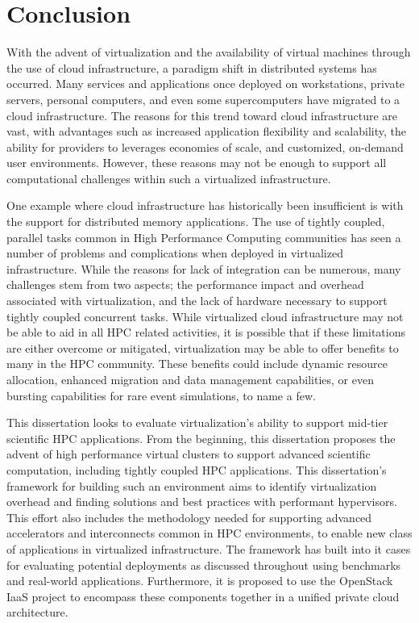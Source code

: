 
\chapter{Conclusion}
\label{chap:conc}

With the advent of virtualization and the availability of virtual machines through the use of cloud infrastructure, a paradigm shift in distributed systems has occurred. Many services and applications once deployed on workstations, private servers, personal computers, and even some supercomputers have migrated to a cloud infrastructure. The reasons for this  trend toward cloud infrastructure are vast, with advantages such as increased application flexibility and scalability, the ability for providers to leverages economies of scale, and customized, on-demand user environments.  However, these reasons may not be enough to support all computational challenges within such a virtualized infrastructure.

One example where cloud infrastructure has historically been insufficient is with the support for distributed memory applications. The use of tightly coupled, parallel tasks common in High Performance Computing communities has seen a number of problems and complications when deployed in virtualized infrastructure.  While the reasons for lack of integration can be numerous, many challenges stem from two aspects; the performance impact and overhead associated with virtualization, and the lack of hardware necessary to support tightly coupled concurrent tasks.  While virtualized cloud infrastructure may not be able to aid in all HPC related activities, it is possible that if these limitations are either overcome or mitigated, virtualization may be able to offer benefits to many in the HPC community. These benefits could include dynamic resource allocation, enhanced migration and data management capabilities, or even bursting capabilities for rare event simulations, to name a few.  

This dissertation looks to evaluate virtualization's ability to support mid-tier scientific HPC applications. From the beginning, this dissertation proposes the advent of high performance virtual clusters to support advanced scientific computation, including tightly coupled HPC applications.  This dissertation's framework for building such an environment aims to identify virtualization overhead and finding solutions and best practices with performant hypervisors. This effort also includes the methodology needed for supporting advanced accelerators and interconnects common in HPC environments, to enable new class of applications in virtualized infrastructure. The framework has built into it cases for evaluating potential deployments as discussed throughout using benchmarks and real-world applications.  Furthermore, it is proposed to use the OpenStack IaaS project to encompass these components together in a unified private cloud architecture.  

